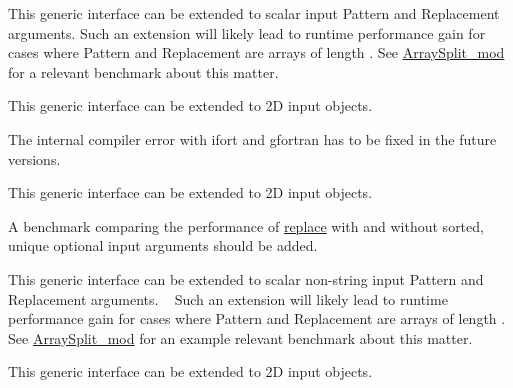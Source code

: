 \begin{DoxyRefList}
\label{todo__todo000007}%
%
 This generic interface can be extended to scalar input {\ttfamily Pattern} and {\ttfamily Replacement} arguments. Such an extension will likely lead to runtime performance gain for cases where {\ttfamily Pattern} and {\ttfamily Replacement} are arrays of length {}. See \mbox{\hyperlink{namespaceArraySplit__mod}{Array\+Split\+\_\+mod}} for a relevant benchmark about this matter. ~\newline


\label{todo__todo000006}%
%
 This generic interface can be extended to 2D input objects. ~\newline


\label{todo__todo000009}%
%
 The internal compiler error with {\ttfamily ifort} and {\ttfamily gfortran} has to be fixed in the future versions. ~\newline
 
\item[Type \mbox{\hyperlink{interfaceArrayReplace__mod_1_1replace}{Array\+Replace\+\_\+mod\+::replace}} ]\label{todo__todo000010}%
%
 This generic interface can be extended to 2D input objects. ~\newline


\label{todo__todo000012}%
%
 A benchmark comparing the performance of \mbox{\hyperlink{interfaceArrayReplace__mod_1_1replace}{replace}} with and without {\ttfamily sorted, unique} optional input arguments should be added.

\label{todo__todo000011}%
%
 This generic interface can be extended to scalar non-\/string input {\ttfamily Pattern} and {\ttfamily Replacement} arguments. ~\newline
 Such an extension will likely lead to runtime performance gain for cases where {\ttfamily Pattern} and {\ttfamily Replacement} are arrays of length {}. See \mbox{\hyperlink{namespaceArraySplit__mod}{Array\+Split\+\_\+mod}} for an example relevant benchmark about this matter. ~\newline
 
\item[Type \mbox{\hyperlink{interfaceArrayResize__mod_1_1resize}{Array\+Resize\+\_\+mod\+::resize}} ]\label{todo__todo000013}%
%
 This generic interface can be extended to 2D input objects. ~\newline
 

\end{DoxyRefList}

